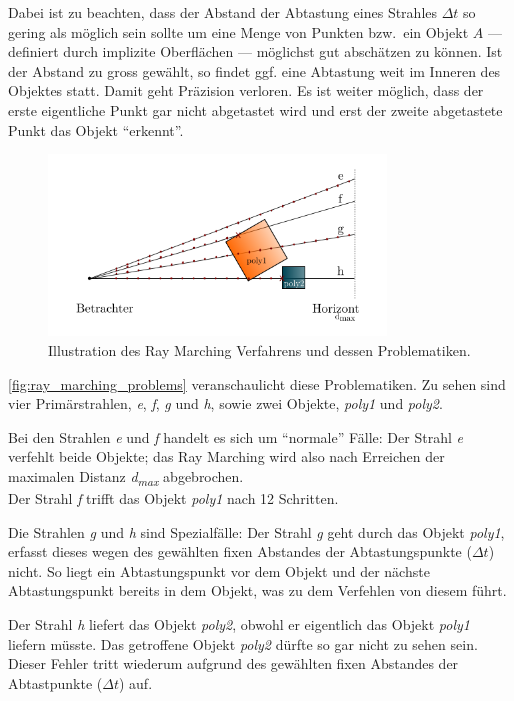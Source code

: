 Dabei ist zu beachten, dass der Abstand der Abtastung eines Strahles
$\Delta{t}$ so gering als möglich sein sollte um eine Menge von Punkten bzw.\ ein
Objekt $A$ --- definiert durch implizite Oberflächen --- möglichst gut
abschätzen zu können. Ist der Abstand zu gross gewählt, so findet ggf.
eine Abtastung weit im Inneren des Objektes statt. Damit geht Präzision
verloren. Es ist weiter möglich, dass der erste eigentliche Punkt gar nicht
abgetastet wird und erst der zweite abgetastete Punkt das Objekt ``erkennt''.

\begin{figure}[H]
    \includegraphics[width=0.8\textwidth]{img/ray_marching_problems.pdf}
    \caption{Illustration des Ray Marching Verfahrens und dessen
        Problematiken.\protect\footnotemark}\label{fig:ray_marching_problems}
\end{figure}

\autoref{fig:ray_marching_problems} veranschaulicht diese
Problematiken. Zu sehen sind vier Primärstrahlen, \textit{e},
\textit{f}, \textit{g} und \textit{h},  sowie zwei Objekte,
\textit{poly1} und \textit{poly2}.

Bei den Strahlen \textit{e} und \textit{f} handelt es sich um
``normale'' Fälle: Der Strahl \textit{e} verfehlt beide Objekte;
das Ray Marching wird also nach Erreichen der maximalen Distanz
\textit{d\textsubscript{max}} abgebrochen.\\
Der Strahl \textit{f} trifft das Objekt \textit{poly1} nach 12
Schritten.

Die Strahlen \textit{g} und \textit{h} sind Spezialfälle: Der Strahl
\textit{g} geht durch das Objekt \textit{poly1}, erfasst dieses wegen
des gewählten fixen Abstandes der Abtastungspunkte ($\Delta{t}$) nicht.
So liegt ein Abtastungspunkt vor dem Objekt und der nächste
Abtastungspunkt bereits in dem Objekt, was zu dem Verfehlen von diesem
führt.

Der Strahl \textit{h} liefert das Objekt \textit{poly2}, obwohl er
eigentlich das Objekt \textit{poly1} liefern müsste. Das getroffene
Objekt \textit{poly2} dürfte so gar nicht zu sehen sein. Dieser Fehler
tritt wiederum aufgrund des gewählten fixen Abstandes der Abtastpunkte
($\Delta{t}$) auf.

